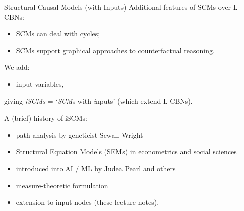 \begin{frame}{Structural Causal Models (with Inputs)}
  Additional features of SCMs over L-CBNs:
  \begin{itemize}
    \item SCMs can deal with cycles;
    \item SCMs support graphical approaches to counterfactual reasoning.
  \end{itemize}
  We add:
  \begin{itemize}
    \item input variables,
  \end{itemize}
  giving \emph{iSCMs} = `\emph{SCM}s with \emph{i}nputs' (which extend L-CBNs).

  \bigskip
  A (brief) history of iSCMs:
  \begin{itemize}
    \item path analysis by geneticist Sewall Wright \cite{Wri21}
    \item Structural Equation Models (SEMs) in econometrics \cite{Wright1928,Haa43,StrotzWold1960} and social sciences \cite{Bollen1989}
    \item introduced into AI / ML by Judea Pearl \cite{Pearl09} and others
    \item measure-theoretic formulation \cite{BFPM21}
    \item extension to input nodes (these lecture notes).
  \end{itemize}
\end{frame}

